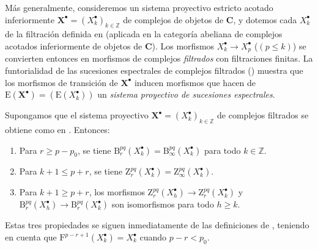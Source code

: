 \begin{env}[13.5.2]
\label{0.13.5.2}
\label{0.13.5.2-fr}
Más generalmente, consideremos un sistema proyectivo estricto acotado
inferiormente
$\mathbf X^\bullet=(X_k^\bullet)_{k\in\mathbb Z}$ de complejos de objetos de
$\boldsymbol{C}$, y dotemos cada $X_k^\bullet$ de la filtración definida en
 (aplicada en la categoría abeliana de complejos acotados
inferiormente de objetos de $\boldsymbol{C}$).
Los morfismos
$X_k^\bullet\to X_p^\bullet$ ($(p\leq k)$) se convierten entonces
en morfismos de complejos \emph{filtrados} con filtraciones finitas.
La funtorialidad de las sucesiones espectrales de complejos filtrados
() muestra que los morfismos de transición de
$\mathbf X^\bullet$ inducen morfismos que hacen de
$\mathrm E(\mathbf X^\bullet)=(\mathrm E(X_k^\bullet))$
un \emph{sistema proyectivo de sucesiones espectrales}.
\end{env}

\begin{lemma}[13.5.3]
\label{0.13.5.3}
\label{0.13.5.3-fr}
Supongamos que el sistema proyectivo
$\mathbf X^\bullet=(X_k^\bullet)_{k\in\mathbb Z}$ de complejos filtrados se
obtiene como en . Entonces:
\begin{enumerate}
  \item[{\rm a)}] Para $r\geq p-p_0$, se tiene
  $\mathrm B_r^{pq}(X_k^\bullet)=\mathrm B_\infty^{pq}(X_k^\bullet)$
  para todo $k\in\mathbb Z$.
  \item[{\rm b)}] Para $k+1\leq p+r$, se tiene
  $\mathrm Z_r^{pq}(X_k^\bullet)=\mathrm Z_\infty^{pq}(X_k^\bullet)$.
  \item[{\rm c)}] Para $k+1\geq p+r$, los morfismos $\mathrm Z_r^{pq}(X_h^\bullet)\to\mathrm Z_r^{pq}(X_k^\bullet)$ y $\mathrm B_r^{pq}(X_h^\bullet)\to\mathrm B_r^{pq}(X_k^\bullet)$ son isomorfismos para todo $h\geq k$.
\end{enumerate}
\end{lemma}

Estas tres propiedades se siguen inmediatamente de las definiciones de
, teniendo en cuenta que
$\mathrm F^{p-r+1}(X_k^\bullet)=X_k^\bullet$ cuando $p-r<p_0$.

